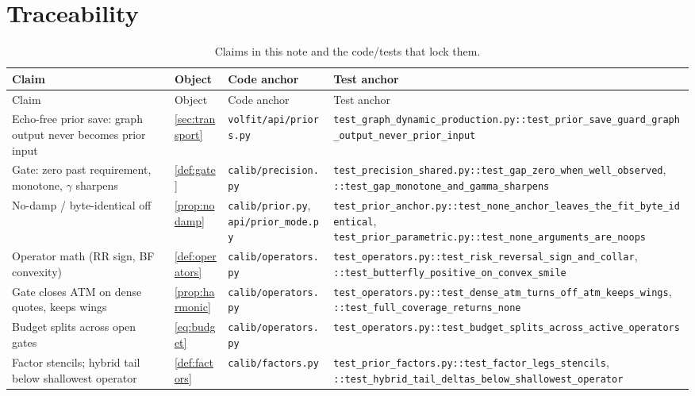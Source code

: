 \documentclass[11pt]{article}
\begin{document}
\section{Traceability}
\label{app:trace}

\begingroup
\small
\setlength{\tabcolsep}{3pt}
\begin{longtable}{@{}p{}p{}p{}p{}@{}}
\caption{Claims in this note and the code/tests that lock them.}\\
\toprule Claim & Object & Code anchor & Test anchor\\ \midrule
\endfirsthead
\toprule Claim & Object & Code anchor & Test anchor\\ \midrule
\endhead
Echo-free prior save: graph output never becomes prior input &
\cref{sec:transport} &
\nolinkurl{volfit/api/priors.py} &
\nolinkurl{test_graph_dynamic_production.py::test_prior_save_guard_graph_output_never_prior_input}\\
\addlinespace
Gate: zero past requirement, monotone, $\gamma$ sharpens &
\cref{def:gate} &
\nolinkurl{calib/precision.py} &
\nolinkurl{test_precision_shared.py::test_gap_zero_when_well_observed},
\nolinkurl{::test_gap_monotone_and_gamma_sharpens}\\
No-damp / byte-identical off &
\cref{prop:nodamp} &
\nolinkurl{calib/prior.py}, \nolinkurl{api/prior_mode.py} &
\nolinkurl{test_prior_anchor.py::test_none_anchor_leaves_the_fit_byte_identical},
\nolinkurl{test_prior_parametric.py::test_none_arguments_are_noops}\\
Operator math (RR sign, BF convexity) &
\cref{def:operators} &
\nolinkurl{calib/operators.py} &
\nolinkurl{test_operators.py::test_risk_reversal_sign_and_collar},
\nolinkurl{::test_butterfly_positive_on_convex_smile}\\
Gate closes ATM on dense quotes, keeps wings &
\cref{prop:harmonic} &
\nolinkurl{calib/operators.py} &
\nolinkurl{test_operators.py::test_dense_atm_turns_off_atm_keeps_wings},
\nolinkurl{::test_full_coverage_returns_none}\\
Budget splits across open gates &
\eqref{eq:budget} &
\nolinkurl{calib/operators.py} &
\nolinkurl{test_operators.py::test_budget_splits_across_active_operators}\\
Factor stencils; hybrid tail below shallowest operator &
\cref{def:factors} &
\nolinkurl{calib/factors.py} &
\nolinkurl{test_prior_factors.py::test_factor_legs_stencils},
\nolinkurl{::test_hybrid_tail_deltas_below_shallowest_operator}\\

\end{longtable}
\end{document}
